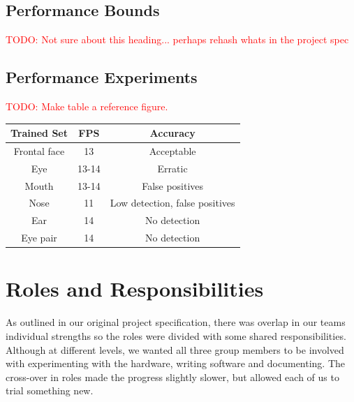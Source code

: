 \documentclass[11pt,a4paper,titlepage]{report}
\begin{document}
\subsection{Performance Bounds}

\textcolor{red}{TODO: Not sure about this heading... perhaps rehash whats in the project spec}

\subsection{Performance Experiments}



\textcolor{red}{TODO: Make table a reference figure.}


\begin{center}
\begin{table}
\begin{tabular}{|c|c|c|}
    \hline
    \textbf{Trained Set} & \textbf{FPS} & \textbf{Accuracy} \\ \hline
    
    Frontal face & 13 & Acceptable \\ \hline
    
    Eye & 13-14 & Erratic \\ \hline
    
    Mouth & 13-14 & False positives \\ \hline
    
    Nose & 11 & Low detection, false positives \\ \hline
    
    Ear & 14 & No detection \\ \hline
    
    Eye pair & 14 & No detection \\ \hline

\end{tabular}
\end{table}
\end{center}




\section{Roles and Responsibilities}

As outlined in our original project specification, there was overlap in our teams individual strengths so the roles were divided with some shared responsibilities. Although at different levels, we wanted all three group members to be involved with experimenting with the hardware, writing software and documenting. The cross-over in roles made the progress slightly slower, but allowed each of us to trial something new.
\end{document}
